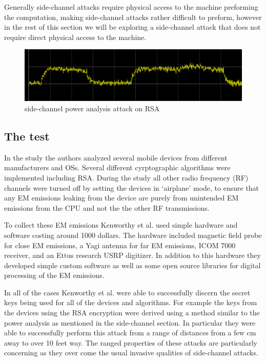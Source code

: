 \documentclass{sig-alternate}
\begin{document}
Generally side-channel attacks require physical access to the machine preforming the computation, making side-channel attacks rather difficult to preform, however in the rest of this section we will be exploring a side-channel attack that does not require direct physical access to the machine.    
   \begin{figure}
		\centering
		\includegraphics[scale=.5]{Power_attack.png}
		\caption{side-channel power analysis attack on RSA}
		\label{Power}
		\end{figure}
\subsection{The test}
In the study the authors analyzed several mobile devices from different manufacturers and OSs. Several different cyrptographic algorithms were implemented including RSA. During the study all other radio frequency (RF) channels were turned off by setting the devices in `airplane' mode, to ensure that any EM emissions leaking from the device are purely from unintended EM emissions from the CPU and not the the other RF transmissions.

To collect these EM emissions Kenworthy et al. used simple hardware and software costing around 1000 dollars. The hardware included magnetic field probe for close EM emissions, a Yagi antenna for far EM emissions, ICOM 7000 receiver, and an Ettus research USRP digitizer. In addition to this hardware they developed simple custom software as well as some open source libraries for digital processing of the EM emissions.

 In all of the cases Kenworthy et al. were able to successfully discern the secret keys being used for all of the devices and algorithms. For example the keys from the devices using the RSA encryption were derived    using a method similar to the power analysis as mentioned in the side-channel section. In particular they were able to successfully perform this attack from a range of distances from a few cm away to over 10 feet way. The ranged properties of these attacks are particularly concerning as they over come the usual invasive qualities of side-channel attacks.
 
\end{document}
